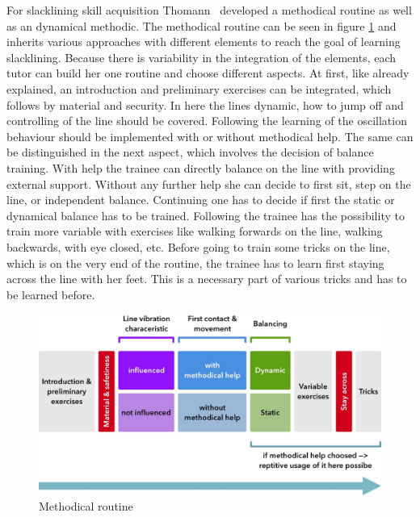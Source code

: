 For slacklining skill acquisition Thomann~\cite{Thomann2013-aa} developed a methodical routine as well as an dynamical methodic. The methodical routine can be seen in figure \ref{fig:3_3_1_methodicalRoutine} and inherits various approaches with different elements to reach the goal of learning slacklining. Because there is variability in the integration of the elements, each tutor can build her one routine and choose different aspects. At first, like already explained, an introduction and preliminary exercises can be integrated, which follows by material and security. In here the lines dynamic, how to jump off and controlling of the line should be covered. Following the learning of the oscillation behaviour should be implemented with or without methodical help. The same can be distinguished in the next aspect, which involves the decision of balance training. With help the trainee can directly balance on the line with providing external support. Without any further help she can decide to first sit, step on the line, or independent balance. Continuing one has to decide if first the static or dynamical balance has to be trained. Following the trainee has the possibility to train more variable with exercises like walking forwards on the line, walking backwards, with eye closed, etc. Before going to train some tricks on the line, which is on the very end of the routine, the trainee has to learn first staying across the line with her feet. This is a necessary part of various tricks and has to be learned before.

\begin{figure}[htb]
	\centering
	\begin{minipage}[t]{1\linewidth}
		\centering
		\includegraphics[width=1\linewidth]{Pictures/3_3_1_methodicalRoutine3}
		\caption{Methodical routine~\cite{Thomann2013-aa}}
		\label{fig:3_3_1_methodicalRoutine}
	\end{minipage}
\end{figure}

